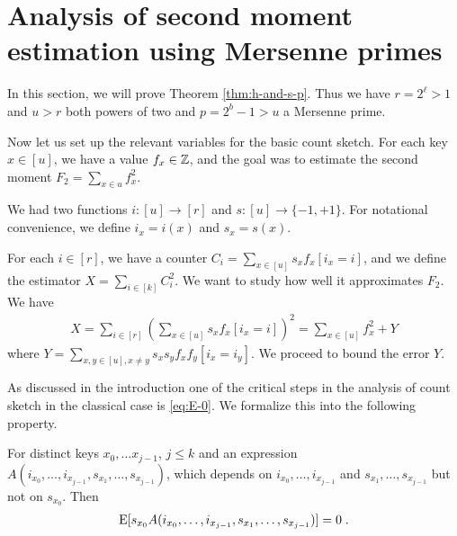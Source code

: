 


\section{Analysis of second moment estimation using  Mersenne primes}\label{sec:analysis-two-for-one}
In this section, we will prove Theorem \ref{thm:h-and-s-p}.  Thus we
have $r=2^\ell>1$ and $u>r$ both powers of two and $p=2^b-1>u$ a
Mersenne prime.

Now let us set up the relevant variables for the basic count sketch.
For each key $x\in [u]$, we have a value $f_x\in \mathbb Z$, and the
goal was to estimate the second moment $F_2 = \sum_{x\in u}f_x^2$.

We had two functions $i:[u]\to[r]$ and $s:[u]\to\{-1,+1\}$. 
For notational convenience, we define $i_x=i(x)$ and $s_x=s(x)$.

For each $i\in [r]$, we have a counter 
$C_i=\sum_{x\in[u]} s_x f_x[i_x=i]$, and we define the 
estimator $X=\sum_{i\in[k]} C_i^2$. We want to study how
well it approximates $F_2$.
We have 
\begin{align}
X=\sum_{i\in[r]}\left( \sum_{x\in[u]}s_x f_x[i_x=i]\right)^2
=\sum_{x\in[u]} f_x^2+Y
\label{eq:decomp}
\end{align}
where $Y=\sum_{x,y\in[u],x\neq y} s_x s_y f_x f_y [i_x = i_y]$.
We proceed to bound the error $Y$.

As discussed in the introduction one of the critical steps in the analysis
of count sketch in the classical case is \cref{eq:E-0}. We formalize this into
the following property.
\begin{property}\label{prop:independence}
    For distinct keys $x_0, \ldots x_{j - 1}$, $j \le k$
    and an expression $A(i_{x_0}, \ldots, i_{x_{j - 1}}, s_{x_1}, \ldots, s_{x_{j - 1}})$,
    which depends on $i_{x_0}, \ldots, i_{x_{j - 1}}$ and $s_{x_1}, \ldots, s_{x_{j - 1}}$
    but not on $s_{x_0}$. Then
    \begin{align}
        \operatorname*{E}[s_{x_0} A(i_{x_0}, \ldots, i_{x_{j - 1}}, s_{x_1}, \ldots, s_{x_{j - 1}})] = 0\; .
    \end{align}
\end{property}


